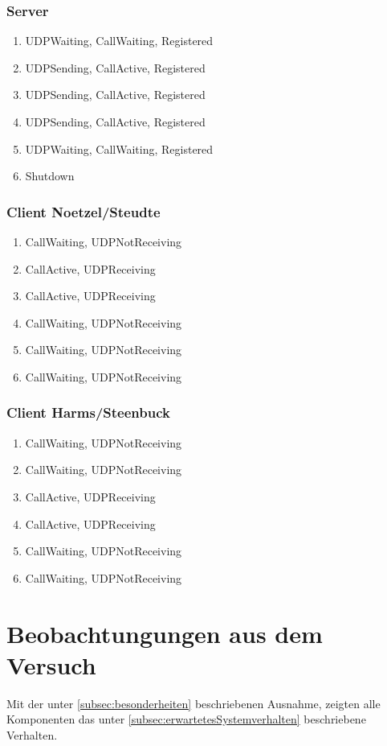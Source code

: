 \documentclass[10pt]{scrartcl}
\begin{document}
\subsubsection{Server}
\begin{enumerate}
	\item UDPWaiting, CallWaiting, Registered
	\item UDPSending, CallActive, Registered
	\item UDPSending, CallActive, Registered
	\item UDPSending, CallActive, Registered
	\item UDPWaiting, CallWaiting, Registered
	\item Shutdown
\end{enumerate}

\subsubsection{Client Noetzel/Steudte}
\begin{enumerate}
	\item CallWaiting, UDPNotReceiving
	\item CallActive, UDPReceiving
	\item CallActive, UDPReceiving
	\item CallWaiting, UDPNotReceiving
	\item CallWaiting, UDPNotReceiving
	\item CallWaiting, UDPNotReceiving
\end{enumerate}

\subsubsection{Client Harms/Steenbuck}
\begin{enumerate}
	\item CallWaiting, UDPNotReceiving
	\item CallWaiting, UDPNotReceiving
	\item CallActive, UDPReceiving
	\item CallActive, UDPReceiving
	\item CallWaiting, UDPNotReceiving
	\item CallWaiting, UDPNotReceiving
\end{enumerate}

	
	
\section{Beobachtungungen aus dem Versuch} \label{sec:beobachtung}
Mit der unter \ref{subsec:besonderheiten} beschriebenen Ausnahme, zeigten alle Komponenten das unter \ref{subsec:erwartetesSystemverhalten} beschriebene Verhalten.
\end{document}
